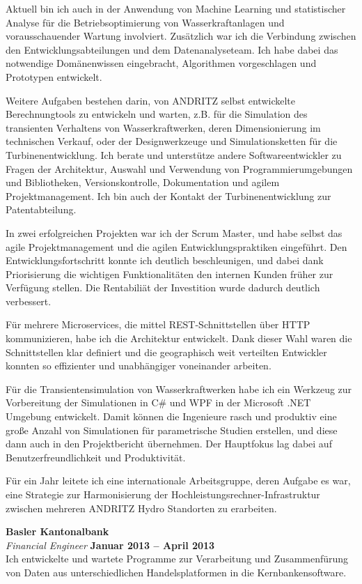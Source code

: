 \documentclass[line,11pt,a4paper]{../resume}
\begin{document}
\begin{resume}
Aktuell bin ich auch in der Anwendung von Machine Learning und statistischer
Analyse f\"ur die Betriebsoptimierung von Wasserkraftanlagen und
vorausschauender Wartung involviert. Zus\"atzlich war ich die Verbindung
zwischen den Entwicklungsabteilungen und dem Datenanalyseteam. Ich habe dabei
das notwendige Dom\"anenwissen eingebracht, Algorithmen vorgeschlagen und
Prototypen entwickelt.

Weitere Aufgaben bestehen darin, von ANDRITZ selbst entwickelte
Berechnungtools zu entwickeln und warten, z.B. f\"ur die Simulation des
transienten Verhaltens von Wasserkraftwerken, deren Dimensionierung im
technischen Verkauf, oder der Designwerkzeuge und Simulationsketten f\"ur die
Turbinenentwicklung. Ich berate und unterst\"utze andere Softwareentwickler zu
Fragen der Architektur, Auswahl und Verwendung von Programmierumgebungen und
Bibliotheken, Versionskontrolle, Dokumentation und agilem Projektmanagement.
Ich bin auch der Kontakt der Turbinenentwicklung zur Patentabteilung.

In zwei erfolgreichen Projekten war ich der Scrum Master, und habe selbst das
agile Projektmanagement und die agilen Entwicklungspraktiken eingef\"uhrt.
Den Entwicklungsfortschritt konnte ich deutlich beschleunigen, und dabei dank
Priorisierung die wichtigen Funktionalit\"aten den internen Kunden fr\"uher zur
Verf\"ugung stellen. Die Rentabili\"at der Investition wurde dadurch deutlich
verbessert.

F\"ur mehrere Microservices, die mittel REST-Schnittstellen \"uber HTTP
kommunizieren, habe ich die Architektur entwickelt. Dank dieser Wahl waren die
Schnittstellen klar definiert und die geographisch weit verteilten Entwickler
konnten so effizienter und unabh\"angiger voneinander arbeiten.

F\"ur die Transientensimulation von Wasserkraftwerken habe ich ein Werkzeug
zur Vorbereitung der Simulationen in C\# und WPF in der Microsoft .NET
Umgebung entwickelt. Damit k\"onnen die Ingenieure rasch und produktiv eine
gro{\ss}e Anzahl von Simulationen f\"ur parametrische Studien erstellen, und
diese dann auch in den Projektbericht \"ubernehmen. Der Hauptfokus lag dabei
auf Benutzerfreundlichkeit und Produktivit\"at.

F\"ur ein Jahr leitete ich eine internationale Arbeitsgruppe, deren Aufgabe
es war, eine Strategie zur Harmonisierung der
Hochleistungsrechner-Infrastruktur zwischen mehreren ANDRITZ Hydro Standorten
zu erarbeiten.

\textbf{Basler Kantonalbank} \vspace{2mm}\\\vspace{1mm}%
\textsl{Financial Engineer} \hfill \textbf{Januar 2013 -- April 2013}\\
Ich entwickelte und wartete Programme zur Verarbeitung und
Zusammenf\"urung von Daten aus unterschiedlichen Handelsplatformen in die
Kernbankensoftware.


\end{resume}
\end{document}
